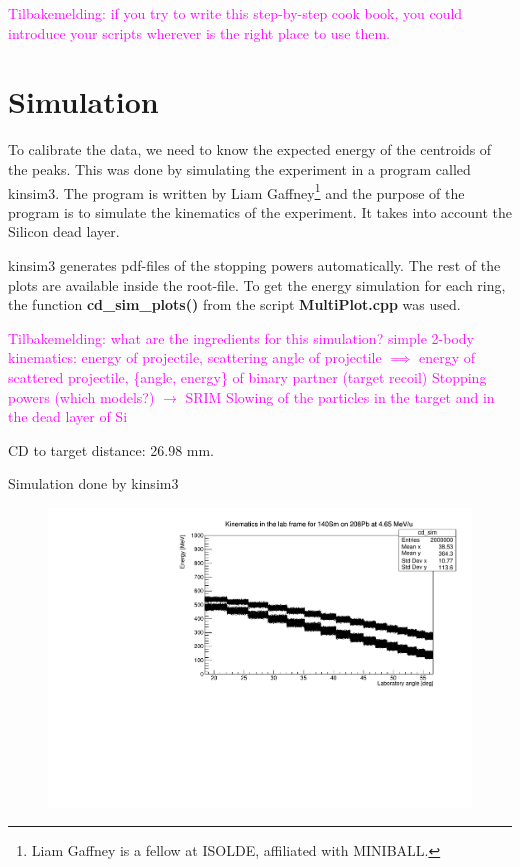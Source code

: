 \documentclass[twoside,english]{uiofysmaster/uiofysmaster}
\begin{document}
\textcolor{Magenta}{Tilbakemelding: \newline 
if you try to write this step-by-step cook book, you could introduce your scripts wherever is the right place to use them. 
}


\section{Simulation}
To calibrate the data, we need to know the expected energy of the centroids of the peaks. 
This was done by simulating the experiment in a program called kinsim3. The program is written by Liam Gaffney\footnote{Liam Gaffney is a fellow at ISOLDE, affiliated with MINIBALL.} and the purpose of the program is to simulate the kinematics of the experiment. 
It takes into account the Silicon dead layer. 

kinsim3 generates pdf-files of the stopping powers automatically. 
The rest of the plots are available inside the root-file. 
To get the energy simulation for each ring, the function \textbf{cd\_sim\_plots()} from the script \textbf{MultiPlot.cpp} was used. 

\textcolor{Magenta}{Tilbakemelding: \newline 
what are the ingredients for this simulation? \newline
simple 2-body kinematics: energy of projectile, scattering angle of projectile $\implies$ energy of scattered projectile, \{angle, energy\} of binary partner (target recoil) \newline
Stopping powers (which models?) $\rightarrow$ SRIM \newline
Slowing of the particles in the target and in the dead layer of Si
}

\bigskip


CD to target distance: 26.98 mm.


Simulation done by kinsim3

\begin{figure}[H]\centering
    \includegraphics[width=\linewidth]{../Plots/simulation/kin_140Sm_208Pb.pdf}
\end{figure}
\end{document}
